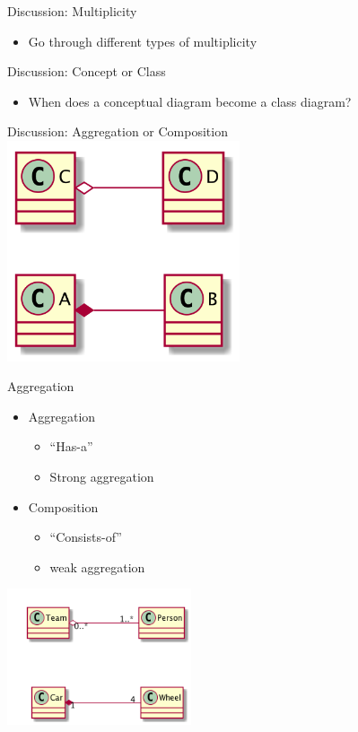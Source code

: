 \documentclass[10pt,t,a4paper]{beamer}
\begin{document}
\begin{frame}[label=sec-1-7]{Discussion: Multiplicity}
\begin{itemize}
\item Go through different types of multiplicity
\end{itemize}
\end{frame}
\begin{frame}[label=sec-1-8]{Discussion: Concept or Class}
\begin{itemize}
\item When does a conceptual diagram become a class diagram?
\end{itemize}
\end{frame}
\begin{frame}[label=sec-1-9]{Discussion: Aggregation or Composition}
\includegraphics[height=6.5cm]{FAggregation.png}
\end{frame}

\begin{frame}[label=sec-1-10]{Aggregation}
\begin{itemize}
\item Aggregation
\begin{itemize}
\item ``Has-a''
\item Strong aggregation
\end{itemize}
\item Composition
\begin{itemize}
\item ``Consists-of''
\item weak aggregation
\end{itemize}
\end{itemize}

\includegraphics[height=4cm]{FAggregation2.png}
\end{frame}
\end{document}
